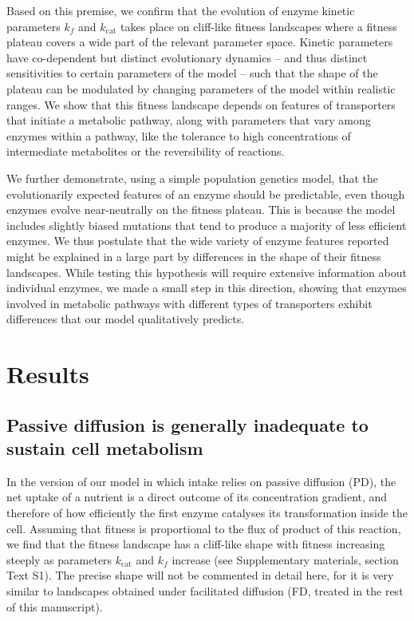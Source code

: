 \documentclass[nogrid,crop,final]{MBE2}%
\begin{document}
Based on this premise, we confirm that the evolution of enzyme kinetic parameters $k_f$ and $k_\text{cat}$ takes place on cliff-like fitness landscapes where a fitness plateau covers a wide part of the relevant parameter space. Kinetic parameters have co-dependent but distinct evolutionary dynamics -- and thus distinct sensitivities to certain parameters of the model -- such that the shape of the plateau can be modulated by changing parameters of the model within realistic ranges. We show that this fitness landscape depends on features of transporters that initiate a metabolic pathway, along with parameters that vary among enzymes within a pathway, like the tolerance to high concentrations of intermediate metabolites or the reversibility of reactions.

We further demonstrate, using a simple population genetics model, that the evolutionarily expected features of an enzyme should be predictable, even though enzymes evolve near-neutrally on the fitness plateau. This is because the model includes slightly biased mutations that tend to produce a majority of less efficient enzymes. We thus postulate that the wide variety of enzyme features reported might be explained in a large part by differences in the shape of their fitness landscapes. While testing this hypothesis will require extensive information about individual enzymes, we made a small step in this direction, showing that enzymes involved in metabolic pathways with different types of transporters exhibit differences that our model qualitatively predicts.  

\section{Results\label{sec:Results}}

\subsection{Passive diffusion is generally inadequate to sustain cell metabolism}

In the version of our model in which intake relies on passive diffusion (PD), the net uptake of a nutrient is a direct outcome of its concentration gradient, and therefore of how efficiently the first enzyme catalyses its transformation inside the cell. Assuming that fitness is proportional to the flux of product of this reaction, we find that the fitness landscape has a cliff-like shape with fitness increasing steeply as parameters $k_\text{cat}$ and $k_f$ increase (see Supplementary materials, section Text S1). The precise shape will not be commented in detail here, for it is very similar to landscapes obtained under facilitated diffusion (FD, treated in the rest of this manuscript). 
\end{document}
